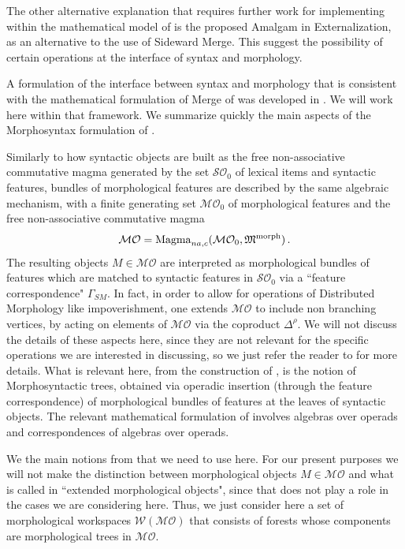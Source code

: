 \documentclass[12pt]{amsart}
\numberwithin{equation}{section}
\def\cM{{\mathcal M}}
\def\cO{{\mathcal O}}
\def\cS{{\mathcal S}}
\def\cW{{\mathcal W}}
\def\fM{{\mathfrak M}}
\begin{document}
The other alternative explanation that requires further work for implementing within
the mathematical model of \cite{MCB} is the proposed Amalgam in Externalization,
as an alternative to the use of Sideward Merge. This suggest the possibility of
certain operations at the interface of syntax and morphology. 

\smallskip

A formulation of the interface between syntax and morphology that is consistent with
the mathematical formulation of Merge of \cite{MCB} was developed in \cite{SentMar}. 
We will work here within that framework. We summarize quickly the main aspects of
the Morphosyntax formulation of  \cite{SentMar}. 

\smallskip 
 
Similarly to how syntactic objects are built as the free non-associative commutative
magma generated by the set $\cS\cO_0$ of lexical items and syntactic features, bundles of
morphological features are described by the same algebraic mechanism, with a finite
generating set $\cM\cO_0$ of morphological features and the free non-associative
commutative magma
$$ \cM\cO= {\rm Magma}_{na,c}(\cM\cO_0, \fM^{\rm morph})\, . $$
The resulting objects $M\in \cM\cO$ are interpreted as morphological bundles of features
which are matched to syntactic features in $\cS\cO_0$ via a ``feature correspondence"
$\Gamma_{SM}$. In fact, in order to allow for operations of
Distributed Morphology like impoverishment, one extends $\cM\cO$ to
include non branching vertices, by acting on elements of $\cM\cO$ via
the coproduct $\Delta^\rho$. We will not discuss the details of these aspects
here, since they are not relevant for the specific operations we are interested
in discussing, so we just refer the reader to \cite{SentMar} for more details. 
What is relevant here, from the construction of \cite{SentMar}, is the
notion of Morphosyntactic trees, obtained via operadic insertion 
(through the feature correspondence) of morphological bundles of features
at the leaves of syntactic objects. The relevant mathematical formulation of \cite{SentMar} 
involves algebras over operads and correspondences of algebras over
operads. 
 
 \medskip
 
 We the main notions from \cite{SentMar} that we need to use here. For our
 present purposes we will not make the distinction between morphological
 objects $M\in \cM\cO$ and what is called in \cite{SentMar} ``extended
 morphological objects", since that does not play a role in the cases 
 we are considering here. Thus, we just consider here a set of
 morphological workspaces $\cW(\cM\cO)$ that consists of forests
 whose components are morphological trees in $\cM\cO$. 
 
\end{document}
